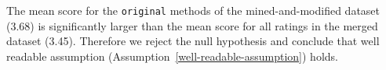 \documentclass[%
class=scrreprt,
chapterprefix=false,%
open=right,%
twoside=false,%
paper=a4,%
logofile={Logo\_zentral\_farbig\_EN.png},%
thesistype=master,%
UKenglish,%
]{se2thesis}
\theoremstyle{definition}
\newenvironment{researchbox}[1]{\begin{tcolorbox}[colback=blue!10!white,colframe=blue!50!black,title=#1]}{\end{tcolorbox}}
\begin{document}

	\begin{researchbox}{Summary (RQ1 - mined-well):}
		The mean score for the \texttt{original} methods of the mined-and-modified dataset (3.68) is significantly larger than the mean score for all ratings in the merged dataset (3.45). Therefore we reject the null hypothesis and conclude that well readable assumption (Assumption~\ref{well-readable-assumption}) holds.
	\end{researchbox}
	
\end{document}
